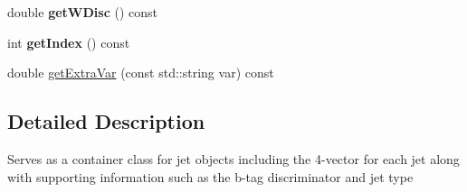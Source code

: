 \begin{DoxyCompactItemize}
\item 
\hypertarget{classConstituent_a9184e1d6ed1691f6efd0c5083444c021}{double {\bfseries get\-W\-Disc} () const }\label{classConstituent_a9184e1d6ed1691f6efd0c5083444c021}

\item 
\hypertarget{classConstituent_a64e38c0209bf5198477160ea690bbaf9}{int {\bfseries get\-Index} () const }\label{classConstituent_a64e38c0209bf5198477160ea690bbaf9}

\item 
double \hyperlink{classConstituent_a8fc04ce34e4e9c162f3d02f62f6b50cb}{get\-Extra\-Var} (const std\-::string var) const 
\end{DoxyCompactItemize}


\subsection{Detailed Description}
Serves as a container class for jet objects including the 4-\/vector for each jet along with supporting information such as the b-\/tag discriminator and jet type 

